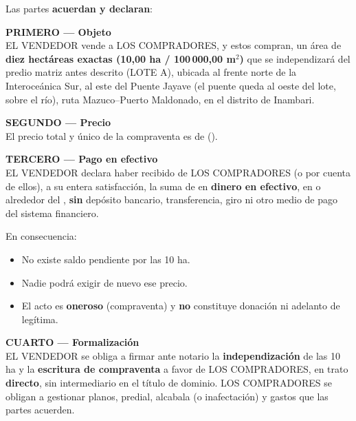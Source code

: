 \documentclass[12pt,a4paper]{article}
\begin{document}
\vspace{0.7em}
\noindent Las partes \textbf{acuerdan y declaran}:

\vspace{0.45em}
\noindent\textbf{PRIMERO --- Objeto}\\[0.15em]
EL VENDEDOR vende a LOS COMPRADORES, y estos compran, un área de \textbf{diez hectáreas exactas (10,00 ha / 100\,000,00 m$^2$)} que se independizará del predio matriz antes descrito (LOTE A), ubicada al frente norte de la Interoceánica Sur, al este del Puente Jayave (el puente queda al oeste del lote, sobre el río), ruta Mazuco--Puerto Maldonado, en el distrito de Inambari.

\vspace{0.45em}
\noindent\textbf{SEGUNDO --- Precio}\\[0.15em]
El precio total y único de la compraventa es de \textbf{\MontoPago} (\textbf{\MontoPagoLetras}).

\vspace{0.45em}
\noindent\textbf{TERCERO --- Pago en efectivo}\\[0.15em]
EL VENDEDOR declara haber recibido de LOS COMPRADORES (o por cuenta de ellos), a su entera satisfacción, la suma de \textbf{\MontoPago} en \textbf{dinero en efectivo}, en o alrededor del \textbf{\FechaPago}, \textbf{sin} depósito bancario, transferencia, giro ni otro medio de pago del sistema financiero.

\vspace{0.25em}
\noindent En consecuencia:
\begin{itemize}[leftmargin=1.2cm,itemsep=0.25em]
\item No existe saldo pendiente por las 10 ha.
\item Nadie podrá exigir de nuevo ese precio.
\item El acto es \textbf{oneroso} (compraventa) y \textbf{no} constituye donación ni adelanto de legítima.
\end{itemize}

\vspace{0.45em}
\noindent\textbf{CUARTO --- Formalización}\\[0.15em]
EL VENDEDOR se obliga a firmar ante notario la \textbf{independización} de las 10 ha y la \textbf{escritura de compraventa} a favor de LOS COMPRADORES, en trato \textbf{directo}, sin intermediario en el título de dominio. LOS COMPRADORES se obligan a gestionar planos, predial, alcabala (o inafectación) y gastos que las partes acuerden.
\end{document}
